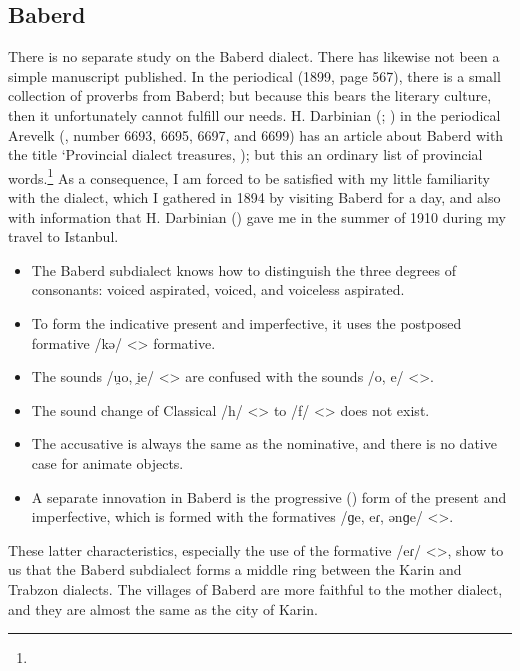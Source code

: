 \subsection{Baberd}
There is no separate study on the Baberd dialect. There has likewise not been a simple manuscript published. In the periodical  (1899, page 567), there is a small collection of proverbs from Baberd; but because this bears the literary culture, then it unfortunately cannot fulfill our needs. H. Darbinian (; ) in the periodical Arevelk (, number 6693, 6695, 6697, and 6699) has an article about Baberd with the title `Provincial dialect treasures, ); but this an ordinary list of provincial words.\footnote{} As a consequence, I am forced to be satisfied with my little familiarity with the dialect, which I gathered in 1894 by visiting Baberd for a day, and also with information that H. Darbinian () gave me in the summer of 1910 during my travel to Istanbul. 

 

\begin{itemize}
	\item The Baberd subdialect knows how to distinguish the three degrees of consonants: voiced aspirated, voiced, and voiceless aspirated. 
	\item To form the indicative present and imperfective, it uses the postposed formative /kə/ <> formative. 
	\item The sounds /u̯o, i̯e/ <> are confused with the sounds /o, e/ <>.
	\item The sound change of Classical /h/ <> to /f/ <> does not exist.
	\item The accusative is always the same as the nominative, and there is no dative case for animate objects. 
	\item A separate innovation in Baberd is the progressive () form of the present and imperfective, which is formed with the formatives /ɡe, eɾ, ənɡe/ <>. 
\end{itemize}

These latter characteristics, especially the use of the formative /eɾ/ <>, show to us that the Baberd subdialect forms a middle ring between the Karin and Trabzon dialects. The villages of Baberd are more faithful to the mother dialect, and they are almost the same as the city of Karin. 
